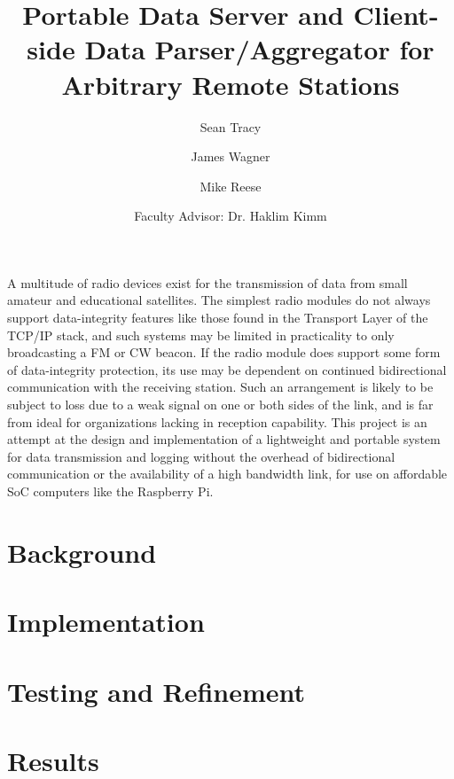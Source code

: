 \documentclass{article}
\title{
	Portable Data Server and Client-side Data Parser/Aggregator for
	Arbitrary Remote Stations
	}
\date{\DTMusedate{creationdate}}
\author[]{Sean Tracy}
\author[]{James Wagner}
\author[]{Mike Reese}
\author[]{\authorcr Faculty Advisor: Dr. Haklim Kimm}
\affil[]{}
\makeatletter
\let\oldabstract\abstract
\let\oldendabstract\endabstract
\renewenvironment{abstract} {
	\renewenvironment{quotation} {
		\list{}{
			\addtolength{\leftmargin}{.40in}
			\listparindent 1.5em%
			\itemindent
			\listparindent
			\rightmargin
			\leftmargin
			\parsep \z@\@plus\p@
			}
		\item\relax
		}
	{\endlist}
	\oldabstract
	}
{\oldendabstract}
\makeatother
\begin{document}
	\maketitle
	\vfill
	\begin{abstract}
		\large{\noindent
			A multitude of radio devices exist for the transmission
			of data from small amateur and educational satellites.
			The simplest radio modules do not always support
			data-integrity features like those found in the
			Transport Layer of the TCP/IP stack, and such systems
			may be limited in practicality to only broadcasting a
			FM or CW beacon. If the radio module does support some
			form of data-integrity protection, its use may be
			dependent on continued bidirectional communication with
			the receiving station. Such an arrangement is likely to
			be subject to loss due to a weak signal on one or both
			sides of the link, and is far from ideal for
			organizations lacking in reception capability. This
			project is an attempt at the design and implementation
			of a lightweight and portable system for data
			transmission and logging without the overhead of
			bidirectional communication or the availability of a
			high bandwidth link, for use on affordable SoC
			computers like the Raspberry Pi.
			}
		\end{abstract}
	\vfill
	\clearpage

	\begin{multicols}{2}
		\section{Background}
		\lipsum[1-3]
		\section{Implementation}
		\lipsum[4-6]
		\section{Testing and Refinement}
		\lipsum[7-9]
		\section{Results}
		\lipsum[10-12]
	\end{multicols}
\end{document}
